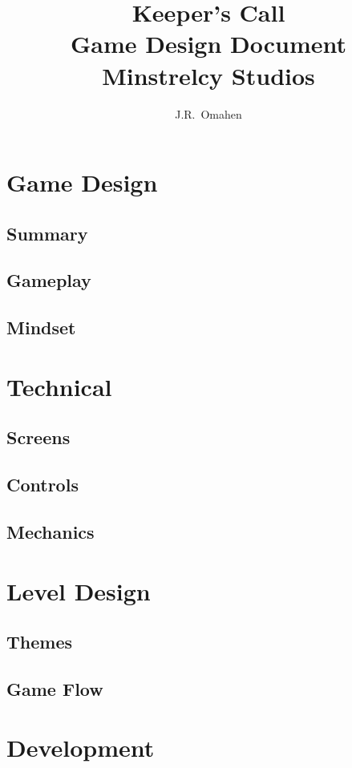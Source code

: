 \documentclass[letterpaper, twoside, 12pt]{memoir}
\title{{\HUGE Keeper's Call}\\
{\small Game Design Document}
\vspace{\fill} \\ 
Minstrelcy Studios
\vspace{\fill} \\ 
}
\author{J.R.~Omahen}
\begin{document}
\maketitle
\newpage

\tableofcontents

\chapter{Game Design}
\section{Summary}



\section{Gameplay}
\section{Mindset}

\chapter{Technical}
\section{Screens}
\section{Controls}
\section{Mechanics}

\chapter{Level Design}
\section{Themes}
\section{Game Flow}

\chapter{Development}
\end{document}
